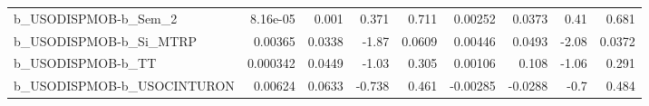 \begin{tabular}{lrrrrrrrr}
b\_USODISPMOB-b\_Sem\_2       &    8.16e-05 &        0.001 &     0.371 &    0.711 &    0.00252 &      0.0373 &         0.41 &         0.681 \\
b\_USODISPMOB-b\_Si\_MTRP     &     0.00365 &       0.0338 &     -1.87 &   0.0609 &    0.00446 &      0.0493 &        -2.08 &        0.0372 \\
b\_USODISPMOB-b\_TT          &    0.000342 &       0.0449 &     -1.03 &    0.305 &    0.00106 &       0.108 &        -1.06 &         0.291 \\
b\_USODISPMOB-b\_USOCINTURON &     0.00624 &       0.0633 &    -0.738 &    0.461 &   -0.00285 &     -0.0288 &         -0.7 &         0.484 \\
\bottomrule
\end{tabular}
